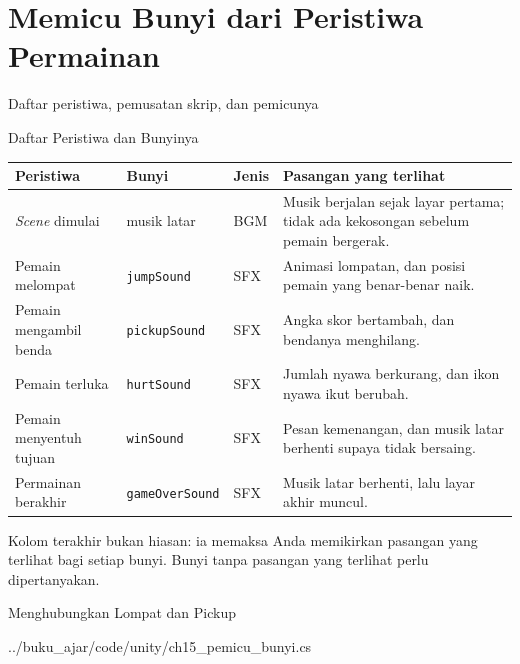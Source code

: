 \documentclass[aspectratio=169,10pt]{beamer}
\begin{document}
\section{Memicu Bunyi dari Peristiwa Permainan}
  {Daftar peristiwa, pemusatan skrip, dan pemicunya}

\begin{frame}{Daftar Peristiwa dan Bunyinya}
{\scriptsize
\renewcommand{\arraystretch}{1.10}
\begin{tabularx}{\textwidth}{@{}>{\raggedright\arraybackslash}p{3.25cm}
    >{\raggedright\arraybackslash}p{2.55cm}
    >{\raggedright\arraybackslash}p{1.15cm}
    >{\raggedright\arraybackslash}X@{}}
\toprule
\textbf{Peristiwa} & \textbf{Bunyi} & \textbf{Jenis} & \textbf{Pasangan yang terlihat} \\
\midrule
\emph{Scene} dimulai & musik latar & BGM &
  Musik berjalan sejak layar pertama; tidak ada kekosongan sebelum pemain
  bergerak. \\
\addlinespace
Pemain melompat & \texttt{jumpSound} & SFX &
  Animasi lompatan, dan posisi pemain yang benar-benar naik. \\
\addlinespace
Pemain mengambil benda & \texttt{pickupSound} & SFX &
  Angka skor bertambah, dan bendanya menghilang. \\
\addlinespace
Pemain terluka & \texttt{hurtSound} & SFX &
  Jumlah nyawa berkurang, dan ikon nyawa ikut berubah. \\
\addlinespace
Pemain menyentuh tujuan & \texttt{winSound} & SFX &
  Pesan kemenangan, dan musik latar berhenti supaya tidak bersaing. \\
\addlinespace
Permainan berakhir & \texttt{gameOverSound} & SFX &
  Musik latar berhenti, lalu layar akhir muncul. \\
\bottomrule
\end{tabularx}}
\vspace{0.12cm}
\begin{kotak}
Kolom terakhir bukan hiasan: ia memaksa Anda memikirkan pasangan yang terlihat
bagi setiap bunyi. Bunyi tanpa pasangan yang terlihat perlu dipertanyakan.
\end{kotak}
\end{frame}

\begin{frame}[fragile]{Menghubungkan Lompat dan Pickup}

  {../buku_ajar/code/unity/ch15_pemicu_bunyi.cs}
\end{frame}
\end{document}
